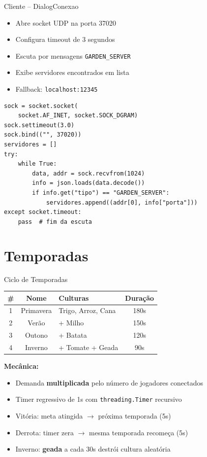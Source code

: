 \documentclass[aspectratio=169]{beamer}
\begin{document}
\begin{frame}[fragile, shrink=12]{Cliente -- DialogConexao}
  \begin{itemize}
    \item Abre socket UDP na porta 37020
    \item Configura timeout de 3 segundos
    \item Escuta por mensagens \texttt{GARDEN\_SERVER}
    \item Exibe servidores encontrados em lista
    \item Fallback: \texttt{localhost:12345}
  \end{itemize}
\begin{lstlisting}[style=pycode, basicstyle=\ttfamily\footnotesize]
sock = socket.socket(
    socket.AF_INET, socket.SOCK_DGRAM)
sock.settimeout(3.0)
sock.bind(("", 37020))
servidores = []
try:
    while True:
        data, addr = sock.recvfrom(1024)
        info = json.loads(data.decode())
        if info.get("tipo") == "GARDEN_SERVER":
            servidores.append((addr[0], info["porta"]))
except socket.timeout:
    pass  # fim da escuta
\end{lstlisting}
\end{frame}

\section{Temporadas}

\begin{frame}{Ciclo de Temporadas}
  \footnotesize
  \begin{tabular}{cclc}
    \toprule
    \textbf{\#} & \textbf{Nome} & \textbf{Culturas} & \textbf{Dura\c{c}\~ao} \\
    \midrule
    1 & Primavera & Trigo, Arroz, Cana & 180s \\
    2 & Ver\~ao & + Milho & 150s \\
    3 & Outono & + Batata & 120s \\
    4 & Inverno & + Tomate + Geada & 90s \\
    \bottomrule
  \end{tabular}
  \vfill
  \textbf{Mec\^anica:}
  \begin{itemize}
    \item Demanda \textbf{multiplicada} pelo n\'umero de jogadores conectados
    \item Timer regressivo de 1s com \texttt{threading.Timer} recursivo
    \item Vit\'oria: meta atingida $\rightarrow$ pr\'oxima temporada (5s)
    \item Derrota: timer zera $\rightarrow$ mesma temporada recome\c{c}a (5s)
    \item Inverno: \textbf{geada} a cada 30s destr\'oi cultura aleat\'oria
  \end{itemize}
\end{frame}
\end{document}
